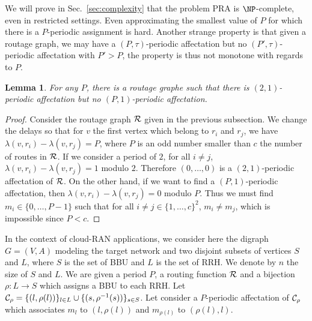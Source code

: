 \documentclass[a4paper,10pt]{article}
\newtheorem{lemma}[theorem]{Lemma}
\begin{document}
      We will prove in Sec.~\ref{sec:complexity} that the problem PRA is $\NP$-complete, even in restricted settings.
      Even approximating the smallest value of $P$ for which there is a $P$-periodic assignment is hard.
      Another strange property is that given a routage graph, we may have a $(P,\tau)$-periodic affectation but no
      $(P',\tau)$-periodic affectation with $P' > P$, the property is thus not monotone with regards to $P$.

	\begin{lemma} 
	 For any $P$, there is a routage graphe such that there is $(2,1)$-periodic affectation but no $(P,1)$-periodic affectation.
	\end{lemma}
\begin{proof}
      Consider the routage graph ${\cal R}$ given in the previous subsection. 
      We change the delays so that for $v$ the first vertex which belong to $r_i$ and $r_j$,
      we have $\lambda(v,r_i) - \lambda(v,r_j)= P$, where $P$ is an odd number smaller than $c$ the number of routes in ${\cal R}$.
      If we consider a period of $2$, for all $i \neq j$, $\lambda(v,r_i) - \lambda(v,r_j) = 1 $ modulo $2$. Therefore $(0,\dots,0)$ is a $(2,1)$-periodic affectation of ${\cal R}$.
      On the other hand, if we want to find a $(P,1)$-periodic affectation, then $\lambda(v,r_i) - \lambda(v,r_j) = 0 $ modulo $P$.
      Thus we must find $m_i \in \{0,\dots,P-1\}$ such that for all $i \neq j \in \{1,\dots,c\}^2$, $m_i \neq m_j$, which is impossible since $P < c$. 
      
\end{proof}
      
% 

      
      In the context of cloud-RAN applications, we consider here the digraph $G=(V,A)$ modeling the target network 
      and two disjoint subsets of vertices $S$ and $L$, where $S$ is the set of BBU and $L$ is the set of RRH. 
      We denote by $n$ the size of $S$ and $L$. We are given a period $P$, a routing function ${\cal R}$ and a bijection $\rho:L\rightarrow S$ which assigns a BBU to each RRH. Let ${\cal C}_{\rho} = \{(l,\rho(l))\}_{l \in L} \cup \{(s,\rho^{-1}(s))\}_{s \in S}$. Let consider a $P$-periodic affectation of ${\cal C}_{\rho}$ which associates $m_l$ to 
      $(l,\rho(l))$ and $m_{\rho(l)}$ to $(\rho(l),l)$.  
      
\end{document}
